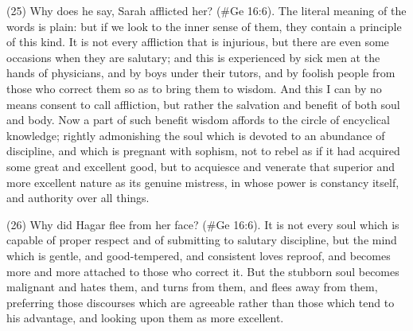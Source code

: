 (25) Why does he say, Sarah afflicted her? (\#Ge 16:6). The literal meaning of the words is
plain: but if we look to the inner sense of them, they contain a principle of this kind. It is not every
affliction that is injurious, but there are even some occasions when they are salutary; and this is
experienced by sick men at the hands of physicians, and by boys under their tutors, and by foolish
people from those who correct them so as to bring them to wisdom. And this I can by no means
consent to call affliction, but rather the salvation and benefit of both soul and body. Now a part of
such benefit wisdom affords to the circle of encyclical knowledge; rightly admonishing the soul
which is devoted to an abundance of discipline, and which is pregnant with sophism, not to rebel as
if it had acquired some great and excellent good, but to acquiesce and venerate that superior and
more excellent nature as its genuine mistress, in whose power is constancy itself, and authority
over all things.

(26) Why did Hagar flee from her face? (\#Ge 16:6). It is not every soul which is capable of
proper respect and of submitting to salutary discipline, but the mind which is gentle, and
good-tempered, and consistent loves reproof, and becomes more and more attached to those who
correct it. But the stubborn soul becomes malignant and hates them, and turns from them, and
flees away from them, preferring those discourses which are agreeable rather than those which
tend to his advantage, and looking upon them as more excellent.

